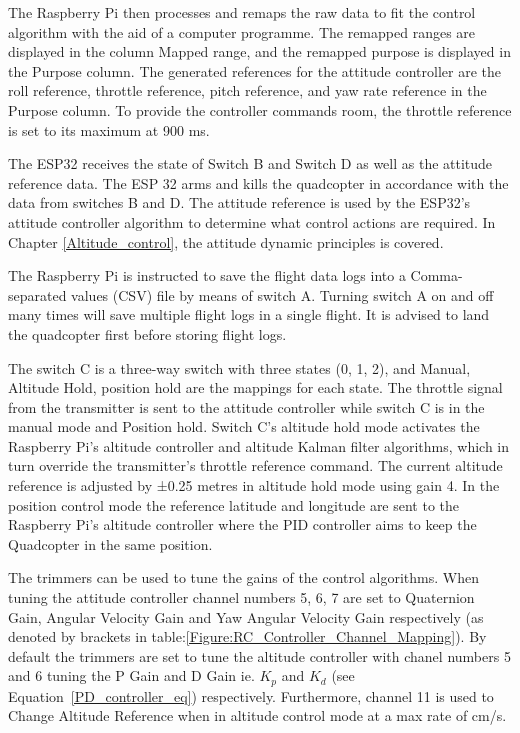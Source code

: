\documentclass{report}
\begin{document}
The Raspberry Pi then processes and remaps the raw data to fit the control
algorithm with the aid of a computer programme. The remapped ranges are
displayed in the column Mapped range, and the remapped purpose is displayed in
the Purpose column. The generated references for the attitude controller are the
roll reference, throttle reference, pitch reference, and yaw rate reference in
the Purpose column. To provide the controller commands room, the throttle
reference is set to its maximum at 900 ms.

The ESP32 receives the state of Switch B and Switch D as well as the attitude
reference data. The ESP 32  arms and kills the quadcopter in accordance with the data
from switches B and D. The attitude reference is used by the ESP32's attitude
controller algorithm to determine what control actions are required. In Chapter
\ref{Altitude_control}, the attitude dynamic principles is covered. 

The Raspberry Pi is instructed to save the flight data logs into a
Comma-separated values (CSV) file by means of switch A. Turning switch A on and
off many times will save multiple flight logs in a single flight. It is advised
to land the quadcopter first before storing flight logs.

The switch C is a three-way switch with three states ({0, 1, 2}), and {Manual,
Altitude Hold, position hold} are the mappings for each state. The throttle
signal from the transmitter is sent to the attitude controller while switch C is
in the manual mode and Position hold. Switch C's altitude hold mode activates
the Raspberry Pi's altitude controller and altitude Kalman filter algorithms,
which in turn override the transmitter's throttle reference command. The current
altitude reference is adjusted by ±0.25 metres in altitude hold mode using gain
4. In the position control mode the reference latitude and longitude are
sent to the Raspberry Pi's altitude controller where the PID controller aims to
keep the Quadcopter in the same position.

The trimmers can be used to tune the gains of the control algorithms. When
tuning the attitude controller channel numbers 5, 6, 7 are set to Quaternion
Gain, Angular Velocity Gain and Yaw Angular Velocity Gain respectively (as
denoted by brackets in table:\ref{Figure:RC_Controller_Channel_Mapping}). By
default the trimmers are set to tune the altitude controller with chanel numbers
5 and 6 tuning the P Gain and D Gain ie. $K_{p}$ and ${K}_{d}$ (see
Equation~\ref{PD_controller_eq}) respectively. Furthermore, channel 11 is used
to Change Altitude Reference when in altitude control mode at a max rate of
\unit[4]{cm/s}. 
\end{document}
